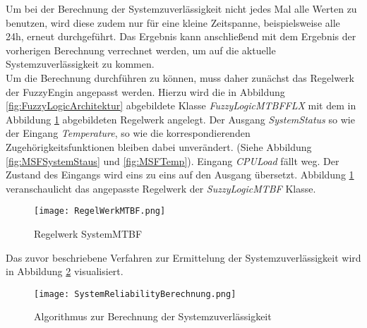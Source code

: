 Um bei der Berechnung der Systemzuverlässigkeit nicht jedes Mal alle Werten zu benutzen, wird diese zudem nur für eine kleine Zeitspanne, beispielsweise alle 24h, erneut durchgeführt. Das Ergebnis kann anschließend mit dem Ergebnis der vorherigen Berechnung verrechnet werden, um auf die aktuelle Systemzuverlässigkeit zu kommen.\\
Um die Berechnung durchführen zu können, muss daher zunächst das Regelwerk der FuzzyEngin angepasst werden. Hierzu wird die in Abbildung \ref{fig:FuzzyLogicArchitektur} abgebildete Klasse \textit{FuzzyLogicMTBFFLX} mit dem in Abbildung \ref{fig:SystemMTBF} abgebildeten Regelwerk angelegt. Der Ausgang \textit{SystemStatus} so wie der Eingang \textit{Temperature}, so wie die korrespondierenden Zugehörigkeitsfunktionen bleiben dabei unverändert. (Siehe Abbildung \ref{fig:MSFSystemStaus} und \ref{fig:MSFTemp}). Eingang \textit{CPULoad} fällt weg. Der Zustand des Eingangs wird eins zu eins auf den Ausgang übersetzt. Abbildung \ref{fig:SystemMTBF} veranschaulicht das angepasste Regelwerk der \textit{SuzzyLogicMTBF} Klasse.
\begin{center}
    \begin{figure}[h!]
        \centering
        \texttt{[image: RegelWerkMTBF.png]}
        \caption{Regelwerk SystemMTBF}
        \label{fig:SystemMTBF}
    \end{figure}
\end{center}
\vspace{-0.5cm}
Das zuvor beschriebene Verfahren zur Ermittelung der Systemzuverlässigkeit wird in Abbildung \ref{fig:AblaufdiagramSystemReliability} visualisiert.
\begin{center}
    \begin{figure}[h!]
        \centering
        \texttt{[image: SystemReliabilityBerechnung.png]}
        \caption{Algorithmus zur Berechnung der Systemzuverlässigkeit}
        \label{fig:AblaufdiagramSystemReliability}
    \end{figure}
\end{center}
\vspace{-0.5cm}

